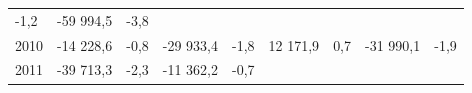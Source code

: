 \begin{longtable}[]{@{}lllllllll@{}}
\begin{minipage}[t]{0.06\columnwidth}
-1,2\strut
\end{minipage} & \begin{minipage}[t]{0.09\columnwidth}\raggedright
-59 994,5\strut
\end{minipage} & \begin{minipage}[t]{0.06\columnwidth}\raggedright
-3,8\strut
\end{minipage}\tabularnewline
\begin{minipage}[t]{0.05\columnwidth}\raggedright
2010\strut
\end{minipage} & \begin{minipage}[t]{0.10\columnwidth}\raggedright
-14 228,6\strut
\end{minipage} & \begin{minipage}[t]{0.06\columnwidth}\raggedright
-0,8\strut
\end{minipage} & \begin{minipage}[t]{0.16\columnwidth}\raggedright
-29 933,4\strut
\end{minipage} & \begin{minipage}[t]{0.06\columnwidth}\raggedright
-1,8\strut
\end{minipage} & \begin{minipage}[t]{0.12\columnwidth}\raggedright
12 171,9\strut
\end{minipage} & \begin{minipage}[t]{0.06\columnwidth}\raggedright
0,7\strut
\end{minipage} & \begin{minipage}[t]{0.09\columnwidth}\raggedright
-31 990,1\strut
\end{minipage} & \begin{minipage}[t]{0.06\columnwidth}\raggedright
-1,9\strut
\end{minipage}\tabularnewline
\begin{minipage}[t]{0.05\columnwidth}\raggedright
2011\strut
\end{minipage} & \begin{minipage}[t]{0.10\columnwidth}\raggedright
-39 713,3\strut
\end{minipage} & \begin{minipage}[t]{0.06\columnwidth}\raggedright
-2,3\strut
\end{minipage} & \begin{minipage}[t]{0.16\columnwidth}\raggedright
-11 362,2\strut
\end{minipage} & \begin{minipage}[t]{0.06\columnwidth}\raggedright
-0,7\strut
\end{minipage} & \begin{minipage}[t]{0.12\columnwidth}\raggedright

\end{minipage}
\end{longtable}
